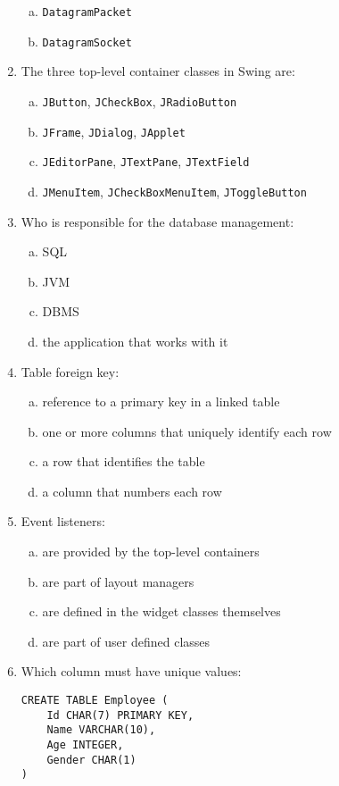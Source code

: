 \documentclass[10pt,a4paper,twocolumn]{article}
\begin{document}
\begin{enumerate}
\begin{enumerate}[(a)]
	\item \texttt{DatagramPacket}
	\item \texttt{DatagramSocket}
\end{enumerate}
\item The three top-level container classes in Swing are:
\begin{enumerate}[(a)]
	\item \texttt{JButton}, \texttt{JCheckBox}, \texttt{JRadioButton}
	\item \texttt{JFrame}, \texttt{JDialog}, \texttt{JApplet}
	\item \texttt{JEditorPane}, \texttt{JTextPane}, \texttt{JTextField}
	\item \texttt{JMenuItem}, \texttt{JCheckBoxMenuItem}, \texttt{JToggleButton}
\end{enumerate}
\item Who is responsible for the database management:
\begin{enumerate}[(a)]
	\item SQL
	\item JVM
	\item DBMS
	\item the application that works with it
\end{enumerate}
\item Table foreign key:
\begin{enumerate}[(a)]
	\item reference to a primary key in a linked table
	\item one or more columns that uniquely identify each row
	\item a row that identifies the table
	\item a column that numbers each row
\end{enumerate}
\item Event listeners:
\begin{enumerate}[(a)]
	\item are provided by the top-level containers
	\item are part of layout managers
	\item are defined in the widget classes themselves
	\item are part of user defined classes
\end{enumerate}
\item Which column must have unique values:
\begin{verbatim}
CREATE TABLE Employee (
    Id CHAR(7) PRIMARY KEY,
    Name VARCHAR(10),
    Age INTEGER,
    Gender CHAR(1)
)
\end{verbatim}

\end{enumerate}
\end{document}
